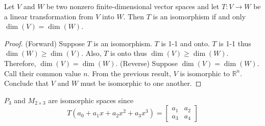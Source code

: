 \documentclass[12pt]{article}
\begin{document}
 \begin{theorem} Let $V$ and $W$ be two nonzero finite-dimensional vector spaces and let $T: V \to W$ be a linear transformation from $V$ into $W$. Then $T$ is an isomorphism if and only $\dim(V) = \dim(W)$. \end{theorem} 
 \begin{proof} (Forward) Suppose $T$ is an isomorphism. $T$ is 1-1 and onto. $T$ is 1-1 thus $\dim(W) \geq \dim(V)$. Also, $T$ is onto thus $\dim(V) \geq \dim(W)$. Therefore, $\dim(V) = \dim(W)$. \newline (Reverse) Suppose $\dim(V) = \dim(W)$. Call their common value $n$. From the previous result, $V$ is isomorphic to $\mathbb{R}^n$. Conclude that $V$ and $W$ must be isomorphic to one another. \end{proof} 
 \begin{example} $P_3$ and $M_{2 \times 3}$ are isomorphic spaces since $$T(a_0 + a_1x + a_2x^2 + a_3x^3) = \begin{bmatrix} a_1 & a_2 \\ a_3 & a_4 \end{bmatrix} $$ \end{example}
 
\end{document}
